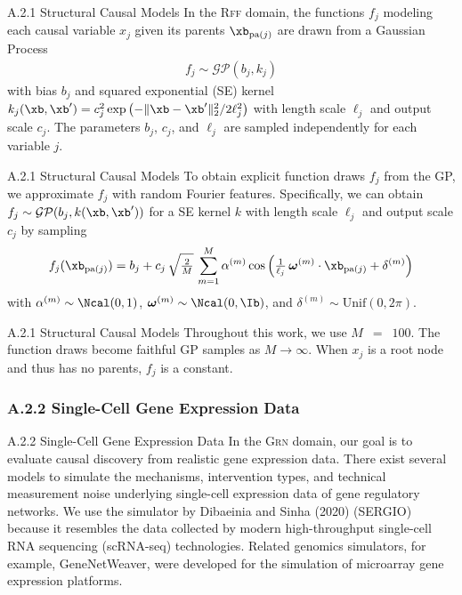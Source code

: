 \documentclass[aspectratio=169,10pt]{beamer}
\newcommand{\domain}[1]{\textsc{#1}}
\newcommand{\rffdomain}{\domain{Rff}\xspace}
\newcommand{\grndomain}{\domain{Grn}\xspace}
\newcommand{\scrna}{{scRNA-seq}\xspace}
\newcommand{\sergio}{{SERGIO}\xspace}
\newcommand{\unif}{\text{Unif}}
\begin{document}
\begin{frame}{A.2.1 Structural Causal Models}
In the \rffdomain domain, the functions $f_j$ modeling each causal variable $x_j$ given its parents $\xb_{\text{pa}(j)}$ are drawn from a Gaussian Process
\begin{align*}
    f_j
    \sim  \mathcal{GP}(b_j, k_j)
\end{align*}
with bias $b_j$ and squared exponential (SE) kernel $k_j(\xb, \xb') = c_j^2 \exp \left( - \lVert \xb-\xb'\rVert_2^2 / 2\ell_j^2 \right)$ with length scale $\ell_j$ and output scale $c_j$. The parameters $b_j$, $c_j$, and $\ell_j$ are sampled independently for each variable $j$.
\end{frame}

\begin{frame}{A.2.1 Structural Causal Models}
\small
To obtain explicit function draws $f_j$ from the GP, we approximate $f_j$ with random Fourier features. Specifically, we can obtain $f_j \sim \mathcal{GP}(b_j, k(\xb, \xb'))$ for a SE kernel $k$ with length scale $\ell_j$ and output scale $c_j$ by sampling
\begin{align*}
    f_j(\xb_{\text{pa}(j)}) = b_j + c_j\,{\sqrt{\tfrac{2}{M}}}\, \sum_{m=1}^{M} \alpha^{(m)} \cos \left ( \tfrac{1}{\ell_j}\, \bm{\omega}^{(m)} \cdot \xb_{\text{pa}(j)} + \delta^{(m)} \right)
\end{align*}
with $\alpha^{(m)} \sim  \Ncal(0, 1)$, $\bm{\omega}^{(m)} \sim \Ncal(0, \Ib)$, and $\delta^{(m)} \sim \unif(0, 2\pi)$.
\end{frame}

\begin{frame}{A.2.1 Structural Causal Models}
Throughout this work, we use $M$~$=$~$100$. The function draws become faithful GP samples as $M\rightarrow \infty$. When $x_j$ is a root node and thus has no parents, $f_j$ is a constant.
\end{frame}

\subsubsection{A.2.2 Single-Cell Gene Expression Data}

\begin{frame}{A.2.2 Single-Cell Gene Expression Data}
In the \grndomain domain, our goal is to evaluate causal discovery from realistic gene expression data. There exist several models to simulate the mechanisms, intervention types, and technical measurement noise underlying single-cell expression data of gene regulatory networks. We use the simulator by Dibaeinia and Sinha (2020) (\sergio) because it resembles the data collected by modern high-throughput single-cell RNA sequencing (\scrna) technologies. Related genomics simulators, for example, GeneNetWeaver, were developed for the simulation of microarray gene expression platforms.
\end{frame}
\end{document}
